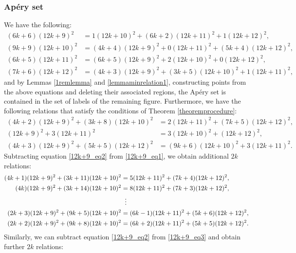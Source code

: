 \documentclass[12pt]{article}
\theoremstyle{remark}
\begin{document}
\subsubsection{Ap{\'e}ry set}
We have the following:
\begin{align}
    (6k+6)(12k+9)^2 &= 1(12k+10)^2 + (6k+2)(12k+11)^2 + 1(12k+12)^2, \label{12k+9minrelation0} \\
    (9k+9)(12k+10)^2 &= (4k+4)(12k+9)^2 + 0(12k+11)^2 + (5k+4)(12k+12)^2, \label{12k+9minrelation1} \\
    (6k+5)(12k+11)^2 &= (6k+5)(12k+9)^2 + 2(12k+10)^2 + 0(12k+12)^2, \label{12k+9minrelation2}\\
    (7k+6)(12k+12)^2 &= (4k+3)(12k+9)^2 + (3k+5)(12k+10)^2 + 1(12k+11)^2,  \label{12k+9minrelation3}
\end{align}
and by Lemmas \ref{1remlemma} and \ref{lemmaminrelation1}, constructing points from the above equations and deleting their associated regions, the Ap{\'e}ry set is contained in the set of labels of the remaining figure.
Furthermore, we have the following relations that satisfy the conditions of Theorem \ref{theoremprocedure}:
\begin{align}
  (4k+2)(12k+9)^2 + (3k+8)(12k+10)^2  &= 2(12k+11)^2 + (7k+5)(12k+12)^2,\label{12k+9_eq1}\\
    (12k+9)^2 + 3(12k+11)^2 &= 3(12k+10)^2 + (12k+12)^2,\label{12k+9_eq2}\\
    (4k+3)(12k+9)^2 + (5k+5)(12k+12)^2  &= (9k+6)(12k+10)^2 + 3(12k+11)^2.\label{12k+9_eq3}
\end{align}
Subtracting equation \eqref{12k+9_eq2} from \eqref{12k+9_eq1}, we obtain additional $2k$ relations:
\begin{equation}\label{12k+9_2kequations_1}
\begin{aligned}    
(4k+1)(12k+9)^2 + (3k+11)(12k+10)^2  &= 5(12k+11)^2 + (7k+4)(12k+12)^2,\\
(4k)(12k+9)^2 + (3k+14)(12k+10)^2  &= 8(12k+11)^2 + (7k+3)(12k+12)^2,\\
 & \hspace{5.6pt}  \vdots      \\
(2k+3)(12k+9)^2 + (9k+5)(12k+10)^2  &= (6k-1)(12k+11)^2 + (5k+6)(12k+12)^2,\\
(2k+2)(12k+9)^2 + (9k+8)(12k+10)^2  &= (6k+2)(12k+11)^2 + (5k+5)(12k+12)^2.
\end{aligned}
\end{equation}
Similarly, we can subtract equation \eqref{12k+9_eq2} from \eqref{12k+9_eq3} and obtain further $2k$ relations:
\end{document}
